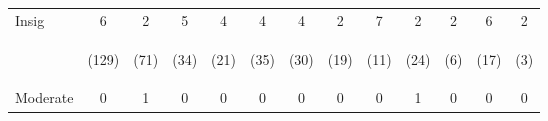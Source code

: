 \begin{tabular}{lcccccccccccc}
\hline \noalign{\smallskip}Insig & 6 & 2 & 5 & 4 & 4 & 4 & 2 & 7 & 2 & 2 & 6 & 2\\
 & \begin{footnotesize}(129)\end{footnotesize} & \begin{footnotesize}(71)\end{footnotesize} & \begin{footnotesize}(34)\end{footnotesize} & \begin{footnotesize}(21)\end{footnotesize} & \begin{footnotesize}(35)\end{footnotesize} & \begin{footnotesize}(30)\end{footnotesize} & \begin{footnotesize}(19)\end{footnotesize} & \begin{footnotesize}(11)\end{footnotesize} & \begin{footnotesize}(24)\end{footnotesize} & \begin{footnotesize}(6)\end{footnotesize} & \begin{footnotesize}(17)\end{footnotesize} & \begin{footnotesize}(3)\end{footnotesize}\\
\noalign{\smallskip}Moderate & 0 & 1 & 0 & 0 & 0 & 0 & 0 & 0 & 1 & 0 & 0 & 0\\

\end{tabular}
